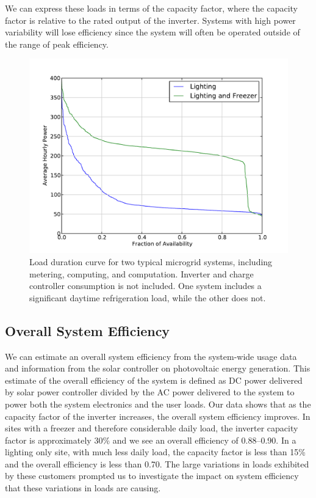 \documentclass[conference]{IEEEtran}
\begin{document}
We can express these loads in terms of the capacity factor,
where the capacity factor is relative to the rated output
of the inverter.
Systems with high power variability will lose efficiency since
the system will often be operated outside of the range of
peak efficiency.

\begin{figure}[h]
\begin{center}
\includegraphics[trim = 0.0in 0.2in 0.0in 0.5in, clip, width=\columnwidth]{figures/two_ldc.pdf}
\end{center}
\caption{Load duration curve for two typical microgrid systems,
including metering, computing, and computation.
Inverter and charge controller consumption is not included.
One system includes a significant daytime refrigeration load,
while the other does not.
}
\label{two_ldc}
\end{figure}

\subsection{Overall System Efficiency}

We can estimate an overall system efficiency from the
system-wide usage data and information from the solar
controller on photovoltaic energy generation.
This estimate of the overall efficiency of the system
is defined as DC power delivered by solar
power controller divided by the AC power delivered to the system
to power both the system electronics and the user loads.
Our data shows that as the capacity factor of the inverter
increases, the overall system efficiency improves.
In sites with a freezer and therefore considerable daily load,
the inverter capacity factor is approximately 30\% and
we see an overall efficiency of 0.88--0.90.
In a lighting only site, with much less daily load, the capacity
factor is less than 15\% and the overall efficiency
is less than 0.70.
The large variations in loads exhibited by these customers prompted
us to investigate the impact on system efficiency that these
variations in loads are causing.
\end{document}
